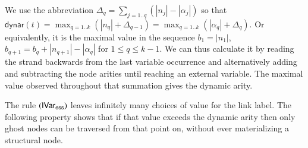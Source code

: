 \documentclass{elsarticle}
\theoremstyle{plain}
\theoremstyle{definition}
\theoremstyle{remark}
\newcommand{\essential}{{\sf ess}}
\newcommand\dynar{\textsf{dynar}} %
\begin{document}
We use the abbreviation $\Delta_q = \sum_{j=1..q} (|n_j|-|\alpha_j|)$ so that
$\dynar(t)
   = \max_{q=1..k} \left( |n_q| + \Delta_{q-1} \right)
   = \max_{q=1..k} \left( |\alpha_q| + \Delta_{q} \right)
$.
Or equivalently, it is the maximal value in the sequence $b_1 = |n_1|$, $b_{q+1} = b_q + |n_{q+1}|-|\alpha_q|$ for $1 \leq q \leq k-1$.
We can thus calculate it by reading the strand backwards from the last variable occurrence and alternatively adding and subtracting the node arities until reaching an external variable. The maximal value observed throughout that summation gives the dynamic arity.


The rule $\rulename{IVar_\essential}$ leaves infinitely many choices of value for the link label. The following property shows that if that value exceeds the dynamic arity then only ghost nodes can be traversed from that point on, without ever materializing a structural node.
\end{document}
